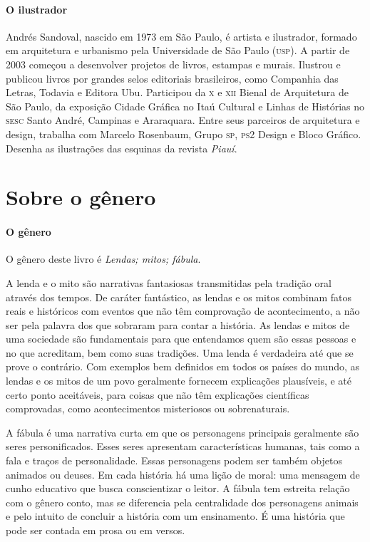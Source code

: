 \documentclass[11pt]{extarticle}
\begin{document}
\paragraph{O ilustrador} Andrés Sandoval, nascido em 1973 em São Paulo, é artista e ilustrador, formado em arquitetura e urbanismo pela Universidade de São Paulo (\textsc{usp}). A partir de 2003 começou a desenvolver projetos de livros, estampas e murais. Ilustrou e publicou livros por grandes selos editoriais brasileiros, como Companhia das Letras, Todavia e Editora Ubu. Participou da \textsc{x} e \textsc{xii} Bienal de Arquitetura de São Paulo, da exposição Cidade Gráfica no Itaú Cultural e Linhas de Histórias no \textsc{sesc} Santo André, Campinas e Araraquara. Entre seus parceiros de arquitetura e design, trabalha com Marcelo Rosenbaum, Grupo \textsc{sp}, \textsc{ps2} Design e Bloco Gráfico. Desenha as ilustrações das esquinas da revista \textit{Piauí}.



\section{Sobre o gênero}

\paragraph{O gênero} O gênero deste livro é \textit{Lendas; mitos; fábula}. 

A lenda e o mito são narrativas fantasiosas transmitidas pela tradição oral através dos tempos. De caráter fantástico, as lendas e os mitos combinam fatos reais e históricos com eventos que não têm comprovação de acontecimento, a não ser pela palavra dos que sobraram para contar a história. As lendas e mitos de uma sociedade são fundamentais para que entendamos quem são essas pessoas e no que acreditam, bem como suas tradições. Uma lenda é verdadeira até que se prove o contrário. Com exemplos bem definidos em todos os países do mundo, as lendas e os mitos de um povo geralmente fornecem explicações plausíveis, e até certo ponto aceitáveis, para coisas que não têm explicações científicas comprovadas, como acontecimentos misteriosos ou sobrenaturais.

A fábula é uma narrativa curta em que os personagens principais geralmente são seres personificados. Esses seres apresentam características humanas, tais como a fala e traços de personalidade. Essas personagens podem ser também objetos animados ou deuses. Em cada história há uma lição de moral: uma mensagem de cunho educativo que busca conscientizar o leitor. A fábula tem estreita relação com o gênero conto, mas se diferencia pela centralidade dos personagens animais e pelo intuito de concluir a história com um ensinamento. É uma história que pode ser contada em prosa ou em versos. 
\end{document}
